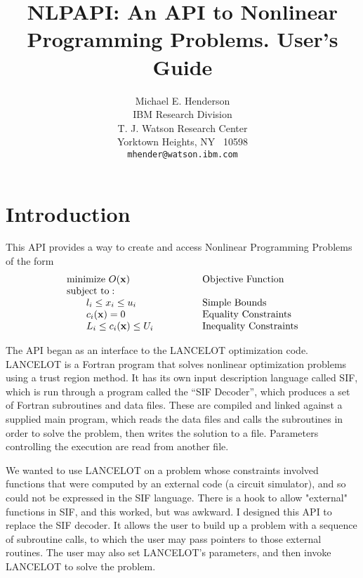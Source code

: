 \documentclass[12pt]{article}
\title{NLPAPI: An API to Nonlinear Programming Problems. {\bf User's Guide}}
\author{
  Michael E. Henderson\\[.5\baselineskip]
  IBM Research Division\\
  T. J. Watson Research Center\\
  Yorktown Heights, NY ~10598\\
  {\tt mhender@watson.ibm.com}
 }
\begin{document}
  \maketitle

   \section{Introduction}

    This API provides a way to create and access Nonlinear Programming Problems of the
    form 
    \begin{displaymath}
     \begin{array}{ll}
      {\rm minimize}~O({\bf x})& \qquad\qquad \rm Objective~Function\\
      {\rm subject~to:}\\
      \qquad l_i \leq x_i \leq u_i& \qquad\qquad  \rm Simple~Bounds\\
      \qquad c_i({\bf x}) = 0& \qquad\qquad \rm Equality
                                                      ~Constraints\\
      \qquad L_i \leq c_i({\bf x}) \leq U_i& \qquad\qquad \rm Inequality~Constraints\\
     \end{array}
    \end{displaymath}

     The API began as an interface to the LANCELOT optimization code.
    LANCELOT is a Fortran program that solves nonlinear optimization 
    problems using a trust region method. It has its own input description language called SIF, 
    which is run through a program called the ``SIF Decoder'', which 
    produces a set of Fortran subroutines and data files. 
    These are compiled and linked against a supplied main program,
    which reads the data files and calls the subroutines
    in order to solve the problem, then writes the solution to a file.
    Parameters controlling the execution are read from another file.

    We wanted to use LANCELOT on a problem whose constraints involved functions
    that were computed by an external code (a circuit simulator), and so could
    not be expressed in the SIF language. There is a hook to allow "external"
    functions in SIF, and this worked, but was awkward. I designed this API to
    replace the SIF decoder. It allows the user to build up a problem
    with a sequence of subroutine calls, to which the user may pass pointers 
    to those external routines. The user may also set LANCELOT's parameters, and
    then invoke LANCELOT to solve the problem.
\end{document}
